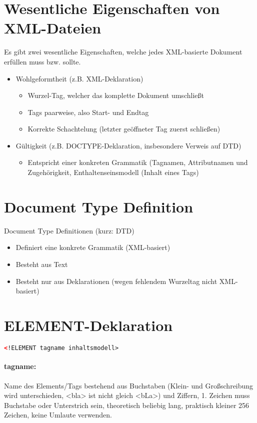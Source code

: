 \section{Wesentliche Eigenschaften von XML-Dateien}
Es gibt zwei wesentliche Eigenschaften, welche jedes XML-basierte Dokument erfüllen muss bzw. sollte.
\begin{itemize}
\item Wohlgeformtheit (z.B. XML-Deklaration)
  \begin{itemize}
  \item Wurzel-Tag, welcher das komplette Dokument umschließt
  \item Tags paarweise, also Start- und Endtag
  \item Korrekte Schachtelung (letzter geöffneter Tag zuerst schließen)
  \end{itemize}
\item Gültigkeit (z.B. DOCTYPE-Deklaration, insbesondere Verweis auf DTD)
  \begin{itemize}
  \item Entspricht einer konkreten Grammatik (Tagnamen, Attributnamen und Zugehörigkeit, Enthaltenseinsmodell  (Inhalt eines Tags)
  \end{itemize}
\end{itemize}


\section{Document Type Definition}
Document Type Definitionen (kurz: DTD)
\begin{itemize}
\item Definiert eine konkrete Grammatik (XML-basiert)
\item Besteht aus Text
\item Besteht nur aus Deklarationen (wegen fehlendem Wurzeltag nicht XML-basiert)
\end{itemize}

\newpage
\section{ELEMENT-Deklaration}
\begin{lstlisting}[caption={Syntax einer ELEMENT-Deklaration}, label={lst:doctype-declaration}, language={XML}]
  <!ELEMENT tagname inhaltsmodell>
\end{lstlisting}
\paragraph{tagname:}Name des Elements/Tags bestehend aus Buchstaben (Klein- und Großschreibung wird unterschieden, <bla> ist nicht gleich <bLa>) und Ziffern, 1. Zeichen muss Buchstabe oder Unterstrich sein, theoretisch beliebig lang, praktisch kleiner 256 Zeichen, keine Umlaute verwenden.
